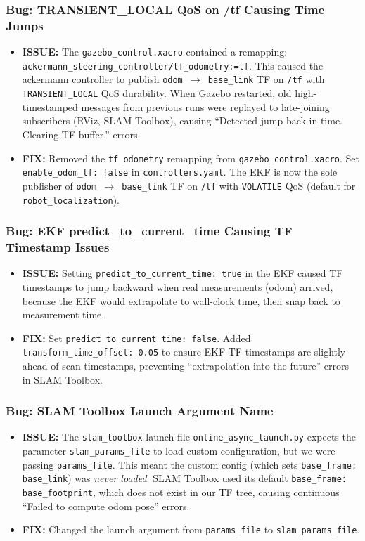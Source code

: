 \documentclass[11pt]{article}
\newcommand{\issue}[1]{\textcolor{issuered}{\textbf{ISSUE:} #1}}
\newcommand{\fix}[1]{\textcolor{fixgreen}{\textbf{FIX:} #1}}
\begin{document}
\subsubsection*{Bug: TRANSIENT\_LOCAL QoS on /tf Causing Time Jumps}
\begin{itemize}
  \item \issue{The \texttt{gazebo\_control.xacro} contained a remapping:
    \texttt{ackermann\_steering\_controller/tf\_odometry:=tf}. This caused the
    ackermann controller to publish \texttt{odom $\to$ base\_link} TF on
    \texttt{/tf} with \texttt{TRANSIENT\_LOCAL} QoS durability. When Gazebo
    restarted, old high-timestamped messages from previous runs were replayed
    to late-joining subscribers (RViz, SLAM Toolbox), causing ``Detected jump
    back in time. Clearing TF buffer.'' errors.}
  \item \fix{Removed the \texttt{tf\_odometry} remapping from
    \texttt{gazebo\_control.xacro}. Set \texttt{enable\_odom\_tf: false} in
    \texttt{controllers.yaml}. The EKF is now the sole publisher of
    \texttt{odom $\to$ base\_link} TF on \texttt{/tf} with \texttt{VOLATILE}
    QoS (default for \texttt{robot\_localization}).}
\end{itemize}

\subsubsection*{Bug: EKF predict\_to\_current\_time Causing TF Timestamp Issues}
\begin{itemize}
  \item \issue{Setting \texttt{predict\_to\_current\_time: true} in the EKF
    caused TF timestamps to jump backward when real measurements (odom) arrived,
    because the EKF would extrapolate to wall-clock time, then snap back to
    measurement time.}
  \item \fix{Set \texttt{predict\_to\_current\_time: false}. Added
    \texttt{transform\_time\_offset: 0.05} to ensure EKF TF timestamps are
    slightly ahead of scan timestamps, preventing ``extrapolation into the
    future'' errors in SLAM Toolbox.}
\end{itemize}

\subsubsection*{Bug: SLAM Toolbox Launch Argument Name}
\begin{itemize}
  \item \issue{The \texttt{slam\_toolbox} launch file
    \texttt{online\_async\_launch.py} expects the parameter
    \texttt{slam\_params\_file} to load custom configuration, but we were passing
    \texttt{params\_file}. This meant the custom config (which sets
    \texttt{base\_frame: base\_link}) was \emph{never loaded}. SLAM Toolbox used
    its default \texttt{base\_frame: base\_footprint}, which does not exist in
    our TF tree, causing continuous ``Failed to compute odom pose'' errors.}
  \item \fix{Changed the launch argument from \texttt{params\_file} to
    \texttt{slam\_params\_file}.}
\end{itemize}
\end{document}

